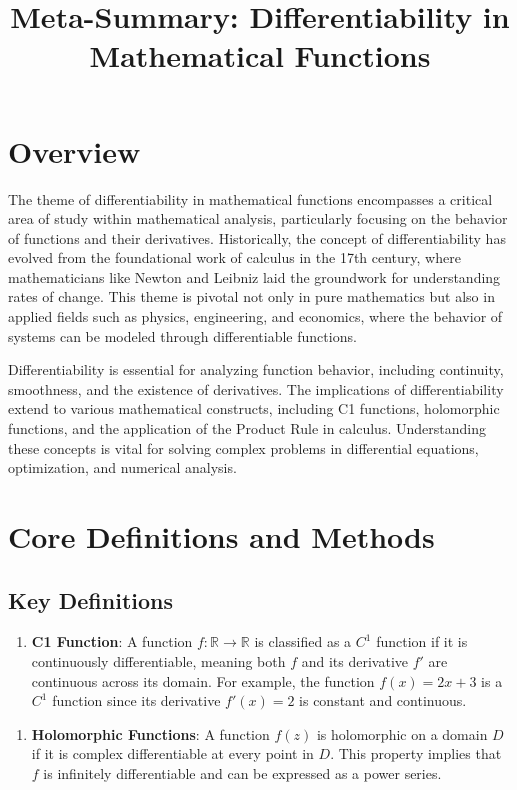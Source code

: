 \documentclass[11pt,a4paper]{article}
\title{Meta-Summary: Differentiability in Mathematical Functions}
\date{}
\begin{document}
\maketitle

\section{Overview}

The theme of differentiability in mathematical functions encompasses a critical area of study within mathematical analysis, particularly focusing on the behavior of functions and their derivatives. Historically, the concept of differentiability has evolved from the foundational work of calculus in the 17th century, where mathematicians like Newton and Leibniz laid the groundwork for understanding rates of change. This theme is pivotal not only in pure mathematics but also in applied fields such as physics, engineering, and economics, where the behavior of systems can be modeled through differentiable functions.

Differentiability is essential for analyzing function behavior, including continuity, smoothness, and the existence of derivatives. The implications of differentiability extend to various mathematical constructs, including C1 functions, holomorphic functions, and the application of the Product Rule in calculus. Understanding these concepts is vital for solving complex problems in differential equations, optimization, and numerical analysis.

\section{Core Definitions and Methods}

\subsection{Key Definitions}
\begin{enumerate}
\item \textbf{C1 Function}: A function \( f: \mathbb{R} \to \mathbb{R} \) is classified as a \( C^1 \) function if it is continuously differentiable, meaning both \( f \) and its derivative \( f' \) are continuous across its domain. For example, the function \( f(x) = 2x + 3 \) is a \( C^1 \) function since its derivative \( f'(x) = 2 \) is constant and continuous.
\end{enumerate}

\begin{enumerate}
\item \textbf{Holomorphic Functions}: A function \( f(z) \) is holomorphic on a domain \( D \) if it is complex differentiable at every point in \( D \). This property implies that \( f \) is infinitely differentiable and can be expressed as a power series.
\end{enumerate}
\end{document}
